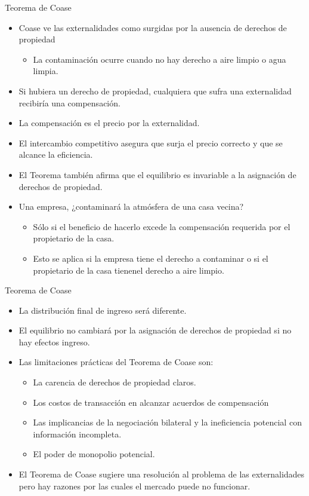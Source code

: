\begin{frame}{Teorema de Coase}
	\begin{itemize}
		\item Coase ve las externalidades como surgidas por la ausencia de derechos de propiedad
			\begin{itemize}
				\item La contaminación ocurre cuando no hay derecho a aire limpio o agua limpia.
			\end{itemize}
		\item Si hubiera un derecho de propiedad, cualquiera que sufra una externalidad recibiría una compensación.
		\item La compensación es el precio por la externalidad.
		\item El intercambio competitivo asegura que surja el precio correcto y que se alcance la eficiencia.
		\item El Teorema también afirma que el equilibrio es invariable a la asignación de derechos de propiedad.
		\item Una empresa, ¿contaminará la atmósfera de una casa vecina?
			\begin{itemize}
				\item Sólo si el beneficio de hacerlo excede la compensación requerida por el propietario de la casa.
				\item Esto se aplica si la empresa tiene el derecho a contaminar o si el propietario de la casa tienenel derecho a aire limpio.
			\end{itemize}
	\end{itemize}
\end{frame}
\begin{frame}{Teorema de Coase}
	\begin{itemize}
		\item La distribución final de ingreso será diferente.
		\item El equilibrio no cambiará por la asignación de derechos de propiedad si no hay efectos ingreso.
		\item Las limitaciones prácticas del Teorema de Coase son:
			\begin{itemize}
				\item La carencia de derechos de propiedad claros.
				\item Los costos de transacción en alcanzar acuerdos de compensación
				\item Las implicancias de la negociación bilateral y la ineficiencia potencial con información incompleta.
				\item El poder de monopolio potencial.
			\end{itemize}
		\item El Teorema de Coase sugiere una resolución al problema de las externalidades pero hay razones por las cuales el mercado puede no funcionar.
	\end{itemize}
\end{frame}
